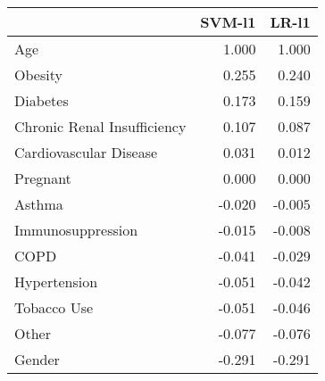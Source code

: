 \begin{tabular}{lrr}
\toprule
{} &  SVM-l1 &  LR-l1 \\
\midrule
Age                         &   1.000 &  1.000 \\
Obesity                     &   0.255 &  0.240 \\
Diabetes                    &   0.173 &  0.159 \\
Chronic Renal Insufficiency &   0.107 &  0.087 \\
Cardiovascular Disease      &   0.031 &  0.012 \\
Pregnant                    &   0.000 &  0.000 \\
Asthma                      &  -0.020 & -0.005 \\
Immunosuppression           &  -0.015 & -0.008 \\
COPD                        &  -0.041 & -0.029 \\
Hypertension                &  -0.051 & -0.042 \\
Tobacco Use                 &  -0.051 & -0.046 \\
Other                       &  -0.077 & -0.076 \\
Gender                      &  -0.291 & -0.291 \\
\bottomrule
\end{tabular}
